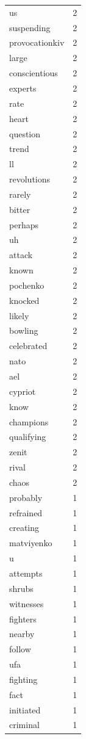 \begin{tabular}{lr}
us & 2 \\
suspending & 2 \\
provocationkiv & 2 \\
large & 2 \\
conscientious & 2 \\
experts & 2 \\
rate & 2 \\
heart & 2 \\
question & 2 \\
trend & 2 \\
ll & 2 \\
revolutions & 2 \\
rarely & 2 \\
bitter & 2 \\
perhaps & 2 \\
uh & 2 \\
attack & 2 \\
known & 2 \\
pochenko & 2 \\
knocked & 2 \\
likely & 2 \\
bowling & 2 \\
celebrated & 2 \\
nato & 2 \\
ael & 2 \\
cypriot & 2 \\
know & 2 \\
champions & 2 \\
qualifying & 2 \\
zenit & 2 \\
rival & 2 \\
chaos & 2 \\
probably & 1 \\
refrained & 1 \\
creating & 1 \\
matviyenko & 1 \\
u & 1 \\
attempts & 1 \\
shrubs & 1 \\
witnesses & 1 \\
fighters & 1 \\
nearby & 1 \\
follow & 1 \\
ufa & 1 \\
fighting & 1 \\
fact & 1 \\
initiated & 1 \\
criminal & 1 \\

\end{tabular}

